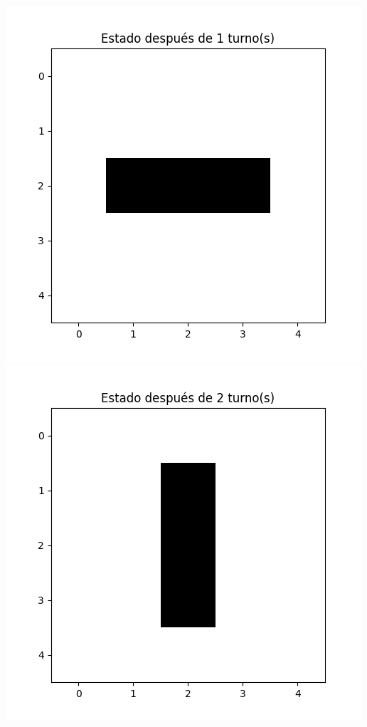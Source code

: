 \begin{itemize}
\begin{center}
        \includegraphics[scale=0.4]{IMA/ejemplosJuegoVida/ejemplo 2.2.png}
        \includegraphics[scale=0.4]{IMA/ejemplosJuegoVida/ejemplo 2.3.png}

\end{center}
\end{itemize}
